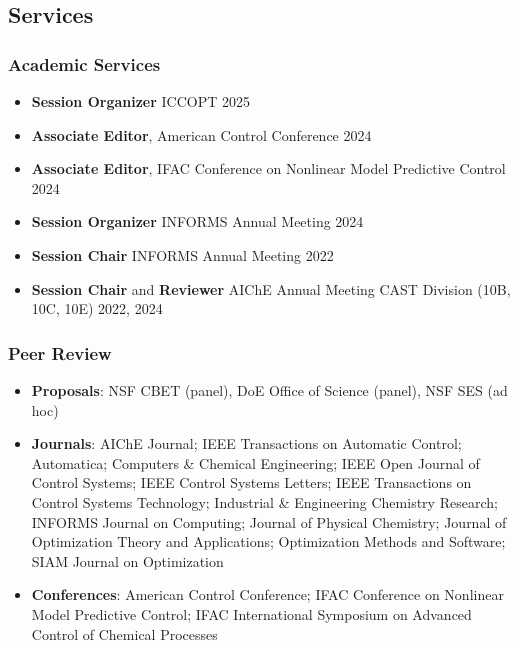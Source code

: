 \subsection*{Services}
\subsubsection*{Academic Services}
\begin{itemize}[leftmargin=*,itemsep=-1pt]
\item[] \textbf{Session Organizer} ICCOPT \hfill 2025
\item[] \textbf{Associate Editor}, American Control Conference \hfill 2024
\item[] \textbf{Associate Editor}, IFAC Conference on Nonlinear Model Predictive Control \hfill 2024
\item[] \textbf{Session Organizer} INFORMS Annual Meeting \hfill 2024
\item[] \textbf{Session Chair} INFORMS Annual Meeting \hfill 2022
\item[] \textbf{Session Chair} and \textbf{Reviewer} AIChE Annual Meeting CAST Division (10B, 10C, 10E) \hfill 2022, 2024
\end{itemize}

\subsubsection*{Peer Review}
\begin{itemize}[itemsep=1pt, parsep=0pt,leftmargin=*]
\item[] \textbf{Proposals}: NSF CBET (panel), DoE Office of Science (panel), NSF SES (ad hoc) 
\item[] \textbf{Journals}: AIChE Journal; IEEE Transactions on Automatic Control; Automatica; Computers \& Chemical Engineering; IEEE Open Journal of Control Systems; IEEE Control Systems Letters; IEEE Transactions on Control Systems Technology; Industrial \& Engineering Chemistry Research; INFORMS Journal on Computing; Journal of Physical Chemistry; Journal of Optimization Theory and Applications; Optimization Methods and Software; SIAM Journal on Optimization
\item[] \textbf{Conferences}: American Control Conference; IFAC Conference on Nonlinear Model Predictive Control; IFAC International Symposium on Advanced Control of Chemical Processes 
\end{itemize}  


